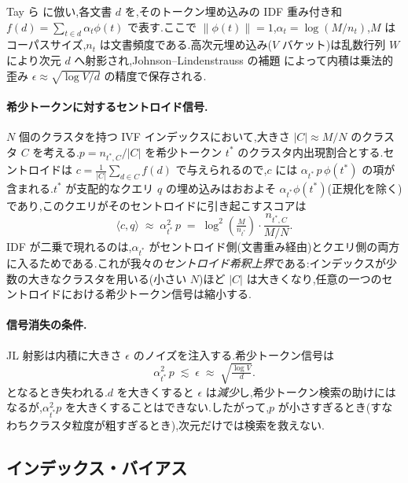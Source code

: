 \documentclass[conference]{IEEEtran}
\begin{document}
Tay ら \cite{tay2020sparse} に倣い,各文書 $d$ を,そのトークン埋め込みの IDF 重み付き和 $f(d)=\sum_{t\in d}\alpha_t\phi(t)$ で表す.ここで $\|\phi(t)\|=1$,$\alpha_t=\log(M/n_t)$,$M$ はコーパスサイズ,$n_t$ は文書頻度である.高次元埋め込み($V$ バケット)は乱数行列 $W$ により次元 $d$ へ射影され,Johnson--Lindenstrauss の補題 \cite{johnson1984extensions} によって内積は乗法的歪み $\epsilon\approx\sqrt{\log V/d}$ の精度で保存される.

\paragraph{希少トークンに対するセントロイド信号.} $N$ 個のクラスタを持つ IVF インデックスにおいて,大きさ $|C|\approx M/N$ のクラスタ $C$ を考える.$p=n_{t^*,C}/|C|$ を希少トークン $t^*$ のクラスタ内出現割合とする.セントロイドは $c=\frac{1}{|C|}\sum_{d\in C}f(d)$ で与えられるので,$c$ には $\alpha_{t^*}\,p\,\phi(t^*)$ の項が含まれる.$t^*$ が支配的なクエリ $q$ の埋め込みはおおよそ $\alpha_{t^*}\phi(t^*)$(正規化を除く)であり,このクエリがそのセントロイドに引き起こすスコアは
\begin{equation}
\langle c, q\rangle \;\approx\; \alpha_{t^*}^2\,p \;=\; \log^2\!\left(\tfrac{M}{n_{t^*}}\right)\cdot\frac{n_{t^*,C}}{M/N}.
\label{eq:centroid_signal_mag}
\end{equation}
IDF が二乗で現れるのは,$\alpha_{t^*}$ がセントロイド側(文書重み経由)とクエリ側の両方に入るためである.これが我々の\emph{セントロイド希釈上界}である:インデックスが少数の大きなクラスタを用いる(小さい $N$)ほど $|C|$ は大きくなり,任意の一つのセントロイドにおける希少トークン信号は縮小する.

\paragraph{信号消失の条件.} JL 射影は内積に大きさ $\epsilon$ のノイズを注入する.希少トークン信号は
\begin{equation}
\alpha_{t^*}^2\,p \;\lesssim\; \epsilon \;\approx\; \sqrt{\tfrac{\log V}{d}}.
\label{eq:signal_loss_general}
\end{equation}
となるとき失われる.$d$ を大きくすると $\epsilon$ は\emph{減少}し,希少トークン検索の助けにはなるが,$\alpha_{t^*}^2 p$ を大きくすることはできない.したがって,$p$ が小さすぎるとき(すなわちクラスタ粒度が粗すぎるとき),次元だけでは検索を救えない.

\subsection{インデックス・バイアス}
\end{document}
